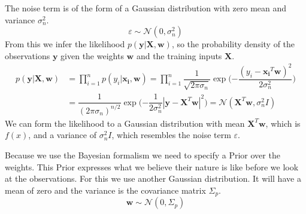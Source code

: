The noise term is of the form of a Gaussian distribution with zero mean and variance $\sigma_n^2$.
\begin{equation}\label{noise_term}
\varepsilon \sim \mathcal{N}(0,\sigma_n^2)
\end{equation}
From this we infer the likelihood $p(\mathbf{y}|\mathbf{X},\mathbf{w})$, so the probability density of the observations $\mathbf{y}$ given the weights $\mathbf{w}$ and the training inputs $\mathbf{X}$\citep[p. 9]{Rasmussen:2005:GPM:1162254}.
\begin{equation}\label{eq:likelihood}
\begin{aligned}
p(\mathbf{y}|\mathbf{X},\mathbf{w}) &= \prod_{i=1}^{n}p(y_i|\mathbf{x_i},\mathbf{w}) = \prod_{i=1}^{n}\dfrac{1}{\sqrt{2\pi\sigma_n}}\exp\big({-\dfrac{(y_i-\mathbf{x_i}^T\mathbf{w})^2}{2\sigma_n^2}}\big)\\
& = \dfrac{1}{(2\pi\sigma_n)^{n/2}}\exp\big({-\dfrac{1}{2\sigma_n^2}|\mathbf{y}-\mathbf{X}^T\mathbf{w}|^2}\big) = \mathcal{N}(\mathbf{X}^T\mathbf{w},\sigma_n^2I)
\end{aligned}
\end{equation}
We can form the likelihood to a Gaussian distribution with mean $\mathbf{X}^T\mathbf{w}$, which is $f(x)$, and a variance of $\sigma_n^2I$, which resembles the noise term $\varepsilon$.

Because we use the Bayesian formalism we need to specify a \gls{Prior} over the weights. This \gls{Prior} expresses what we believe their nature is like before we look at the observations. For this we use another Gaussian distribution. It will have a mean of zero and the variance is the covariance matrix $\Sigma_p$\citep[p. 9]{Rasmussen:2005:GPM:1162254}.
\begin{equation}\label{eq:weight_prior}
\mathbf{w} \sim \mathcal{N}(0,\Sigma_p)
\end{equation}

